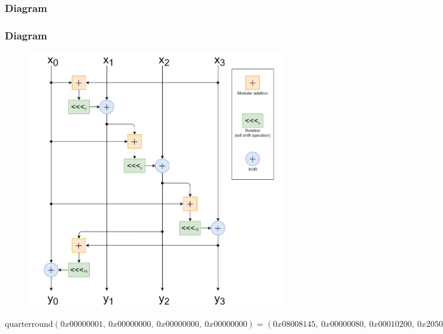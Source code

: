 \subsubsection{Diagram}
\begin{frame}
\frametitle{Diagram}

\begin{figure}
    \centering
    \includegraphics[scale=0.28]{qr.png}
\end{figure}
{\tiny
$\text{quarterround}(0x00000001, \ 0x00000000, \ 0x00000000, \ 0x00000000) = (0x08008145, \ 0x00000080, \ 0x00010200, \ 0x20500000)$
}
\end{frame}